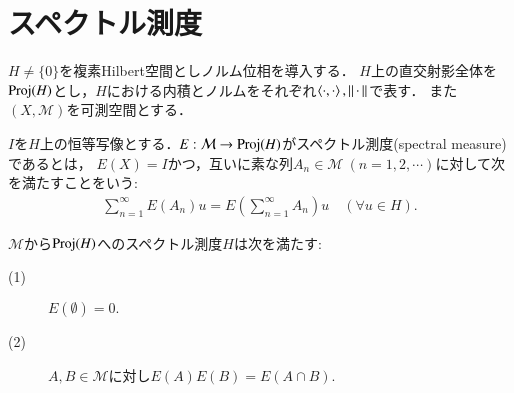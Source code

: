 \section{スペクトル測度}
	$H \neq \{0\}$を複素Hilbert空間としノルム位相を導入する．
	$H$上の直交射影全体を$\mathrm{Proj}( H )$とし，$H$における内積とノルムをそれぞれ$\inprod<\cdot,\cdot>,\Norm{\cdot}{}$で表す．
	また$(X,\mathcal{M})$を可測空間とする．
	
	\begin{screen}
		\begin{dfn}[スペクトル測度]
			$I$を$H$上の恒等写像とする．$E:\mathcal{M} \rightarrow \mathrm{Proj}( H )$がスペクトル測度(spectral measure)であるとは，
			$E(X) = I$かつ，互いに素な列$A_n \in \mathcal{M}\ (n=1,2,\cdots)$に対して次を満たすことをいう:
			\begin{align}
				\sum_{n=1}^{\infty} E(A_n)u = E(\sum_{n=1}^{\infty} A_n)u \quad (\forall u \in H).
				\label{eq:sigma_additivity_spectral_measures}
			\end{align}
			\label{dfn:spectral_measure}
		\end{dfn}
	\end{screen}
	
	\begin{screen}
		\begin{lem}[スペクトル測度の積]
			$\mathcal{M}$から$\mathrm{Proj}( H )$へのスペクトル測度$H$は次を満たす:
			\begin{description}
				\item[(1)] $E(\emptyset) = 0.$
				\item[(2)] $A,B \in \mathcal{M}$に対し$E(A) E(B) = E(A \cap B)$.
			\end{description}
			\label{lem:product_of_spectral_measure}
		\end{lem}
	\end{screen}
	
